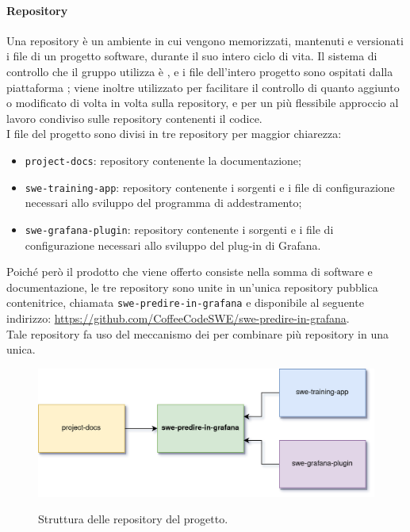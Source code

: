 \documentclass[../norme-di-progetto.tex]{subfiles}
\begin{document}
\paragraph{Repository}
Una repository è un ambiente in cui vengono memorizzati, mantenuti e versionati i file di un progetto software, durante il suo intero ciclo di vita. Il sistema di controllo che il gruppo utilizza è , e i file dell'intero progetto sono ospitati dalla piattaforma ; viene inoltre utilizzato  per facilitare il controllo di quanto aggiunto o modificato di volta in volta sulla repository, e  per un più flessibile approccio al lavoro condiviso sulle repository contenenti il codice. \\
I file del progetto sono divisi in tre repository per maggior chiarezza:
\begin{itemize}
  \item \texttt{project-docs}: repository contenente la documentazione;
  \item \texttt{swe-training-app}: repository contenente i sorgenti e i file di configurazione necessari allo sviluppo del programma di addestramento;
  \item \texttt{swe-grafana-plugin}: repository contenente i sorgenti e i file di configurazione necessari allo sviluppo del plug-in di Grafana.
\end{itemize}
Poiché però il prodotto che viene offerto consiste nella somma di software e documentazione, le tre repository sono unite in un'unica repository pubblica contenitrice, chiamata \texttt{swe-predire-in-grafana} e disponibile al seguente indirizzo: \href{https://github.com/CoffeeCodeSWE/swe-predire-in-grafana}{https://github.com/CoffeeCodeSWE/swe-predire-in-grafana}. \\
Tale repository fa uso del meccanismo dei  per combinare più repository in una unica.

\begin{figure}[H]
  \centering
  \includegraphics[width=15cm]{img/git-submodules.png}
  \label{fig:errori_pdq}
  \caption{Struttura delle repository del progetto.}
\end{figure}
\end{document}
